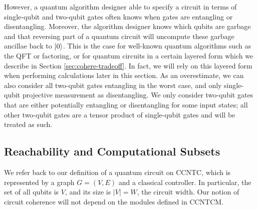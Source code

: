 However, a quantum algorithm designer able to specify a circuit in terms of single-qubit and
two-qubit gates often knows when gates are entangling or disentangling.
Moreover, the algorithm designer knows which qubits are garbage and that reversing
part of a quantum circuit will uncompute these garbage ancillae back to $\left\vert{0}\right\rangle$.
This is
the case for well-known quantum algorithms such as the QFT or factoring, or
for quantum circuits in a certain layered form which we describe in Section \ref{sec:cohere-tradeoff}.
In fact, we will rely on this layered form when performing
calculations later in this section.
As an overestimate, we can also consider all two-qubit gates entangling in the worst case, and
only single-qubit projective measurement as disentangling.
We only consider two-qubit gates that are either potentially entangling or disentangling
for some input states; all other two-qubit gates are a tensor product of
single-qubit gates and will be treated as such.

\subsection{Reachability and Computational Subsets}
\label{subsec:cohere-subset}

We refer back to our definition of a quantum circuit on
\textsf{CCNTC}, which is represented by a graph $G = (V,E)$ and a
classical controller. In particular, the set of all qubits is $V$,
and its size is $|V|=W$, the circuit width.
Our notion of circuit coherence will not depend
on the modules defined in \textsf{CCNTCM}.

